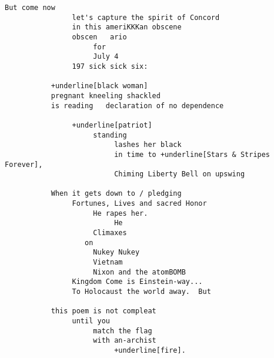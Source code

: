 \begin{Verbatim}[commandchars=+\[\]]
           But come now
                let's capture the spirit of Concord
                in this ameriKKKan obscene
                obscen   ario
                     for
                     July 4
                197 sick sick six:
                     
           +underline[black woman]
           pregnant kneeling shackled
           is reading   declaration of no dependence
           
                +underline[patriot]
                     standing
                          lashes her black
                          in time to +underline[Stars & Stripes Forever],
                          Chiming Liberty Bell on upswing
                     
           When it gets down to / pledging
                Fortunes, Lives and sacred Honor
                     He rapes her.
                          He
                     Climaxes
                   on
                     Nukey Nukey
                     Vietnam
                     Nixon and the atomBOMB
                Kingdom Come is Einstein-way...
                To Holocaust the world away.  But
                
           this poem is not compleat
                until you
                     match the flag
                     with an-archist
                          +underline[fire].
\end{Verbatim}